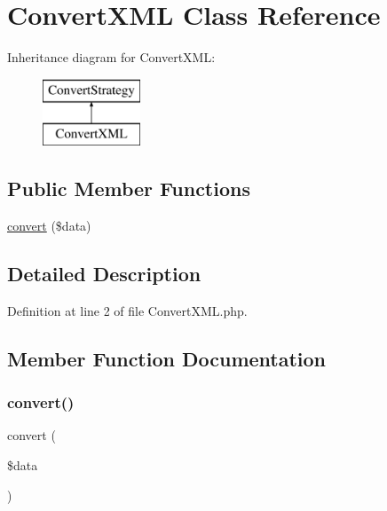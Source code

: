 \hypertarget{class_convert_x_m_l}{}\section{Convert\+X\+ML Class Reference}
\label{class_convert_x_m_l}
Inheritance diagram for Convert\+X\+ML\+:\begin{figure}[H]
\begin{center}
\leavevmode
\includegraphics[height=2.000000cm]{class_convert_x_m_l}
\end{center}
\end{figure}
\subsection*{Public Member Functions}
\begin{DoxyCompactItemize}
\item 
\hyperlink{class_convert_x_m_l_a41444ea294bbd35a6c07ef4e9faeae10}{convert} (\$data)
\end{DoxyCompactItemize}


\subsection{Detailed Description}


Definition at line 2 of file Convert\+X\+M\+L.\+php.



\subsection{Member Function Documentation}
\hypertarget{class_convert_x_m_l_a41444ea294bbd35a6c07ef4e9faeae10}{}\label{class_convert_x_m_l_a41444ea294bbd35a6c07ef4e9faeae10} 
\subsubsection{\texorpdfstring{convert()}{convert()}}
{\footnotesize\ttfamily convert (\begin{DoxyParamCaption}\item[{}]{\$data }\end{DoxyParamCaption})}

